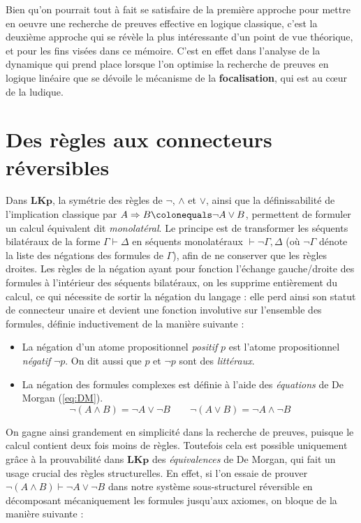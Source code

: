 \documentclass[12pt]{report}
\newcommand{\lto}{\Rightarrow}
\newcommand{\seq}{\vdash}
\begin{document}
Bien qu'on pourrait tout à fait se satisfaire de la première approche pour mettre en oeuvre une recherche de preuves effective en logique classique, c'est la deuxième approche qui se révèle la plus intéressante d'un point de vue théorique, et pour les fins visées dans ce mémoire. C'est en effet dans l'analyse de la dynamique qui prend place lorsque l'on optimise la recherche de preuves en logique linéaire que se dévoile le mécanisme de la \textbf{focalisation}, qui est au cœur de la ludique.

\chapter*{Des règles aux connecteurs réversibles}

Dans $\mathbf{LKp}$, la symétrie des règles de $\neg$, $\land$ et $\lor$, ainsi que la définissabilité de l'implication classique par $A \lto B \colonequals \neg A \lor B$, permettent de formuler un calcul équivalent dit \emph{monolatéral}. Le principe est de transformer les séquents bilatéraux de la forme $\Gamma \seq \Delta$ en séquents monolatéraux $\seq \neg \Gamma,\Delta$ (où $\neg \Gamma$ dénote la liste des négations des formules de $\Gamma$), afin de ne conserver que les règles droites. Les règles de la négation ayant pour fonction l'échange gauche/droite des formules à l'intérieur des séquents bilatéraux, on les supprime entièrement du calcul, ce qui nécessite de sortir la négation du langage : elle perd ainsi son statut de connecteur unaire et devient une fonction involutive sur l'ensemble des formules, définie inductivement de la manière suivante :

\begin{itemize}
    \item La négation d'un atome propositionnel \emph{positif} $p$ est l'atome propositionnel \emph{négatif} $\neg p$. On dit aussi que $p$ et $\neg p$ sont des \emph{littéraux}.
    \item La négation des formules complexes est définie à l'aide des \emph{équations} de De Morgan (\ref{eq:DM}).
        \begin{equation} \label{eq:DM}
            \neg (A \land B) = \neg A \lor \neg B \qquad \neg (A \lor B) = \neg A \land \neg B \qquad
        \end{equation}
\end{itemize}

On gagne ainsi grandement en simplicité dans la recherche de preuves, puisque le calcul contient deux fois moins de règles. Toutefois cela est possible uniquement grâce à la prouvabilité dans $\mathbf{LKp}$ des \emph{équivalences} de De Morgan, qui fait un usage crucial des règles structurelles. En effet, si l'on essaie de prouver $\neg (A \land B) \seq \neg A \lor \neg B$ dans notre système sous-structurel réversible en décomposant mécaniquement les formules jusqu'aux axiomes, on bloque de la manière suivante :
\end{document}
